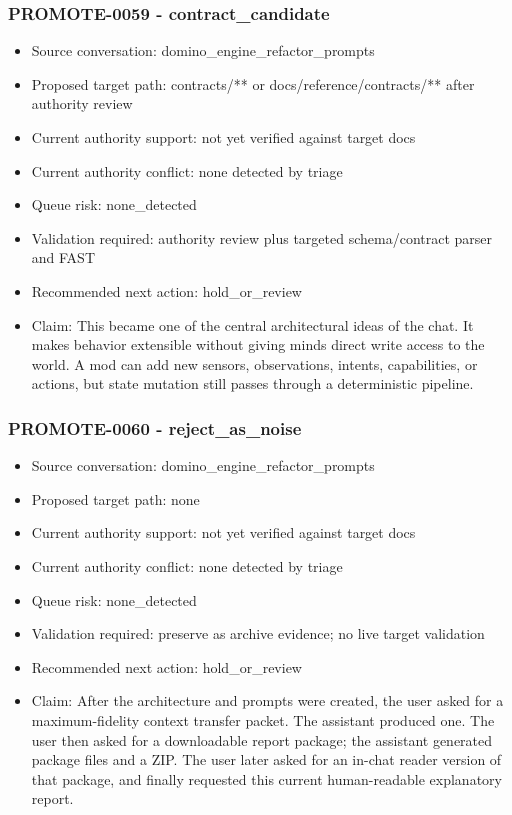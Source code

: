 \documentclass[11pt,a4paper]{report}
\begin{document}
\subsubsection{PROMOTE-0059 - contract\_candidate}

\begin{itemize}
\item Source conversation: domino\_engine\_refactor\_prompts
\item Proposed target path: contracts/** or docs/reference/contracts/** after authority review
\item Current authority support: not yet verified against target docs
\item Current authority conflict: none detected by triage
\item Queue risk: none\_detected
\item Validation required: authority review plus targeted schema/contract parser and FAST
\item Recommended next action: hold\_or\_review
\item Claim: This became one of the central architectural ideas of the chat. It makes behavior extensible without giving minds direct write access to the world. A mod can add new sensors, observations, intents, capabilities, or actions, but state mutation still passes through a deterministic pipeline.
\end{itemize}

\subsubsection{PROMOTE-0060 - reject\_as\_noise}

\begin{itemize}
\item Source conversation: domino\_engine\_refactor\_prompts
\item Proposed target path: none
\item Current authority support: not yet verified against target docs
\item Current authority conflict: none detected by triage
\item Queue risk: none\_detected
\item Validation required: preserve as archive evidence; no live target validation
\item Recommended next action: hold\_or\_review
\item Claim: After the architecture and prompts were created, the user asked for a maximum-fidelity context transfer packet. The assistant produced one. The user then asked for a downloadable report package; the assistant generated package files and a ZIP. The user later asked for an in-chat reader version of that package, and finally requested this current human-readable explanatory report.
\end{itemize}
\end{document}
